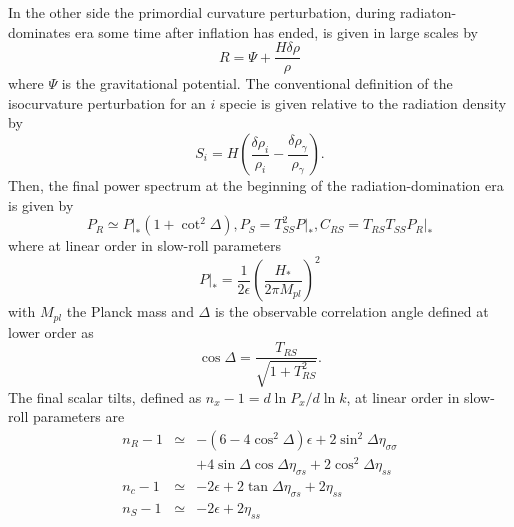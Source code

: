 \documentclass[twocolumn,           %
               showpacs,            %
               preprintnumbers,     %
               aps,                 %
               prl,          	    %
               letterpaper,             %
               superscriptaddress,      %
               nofootinbib,         %
               tightenlines,        %
               floats,floatfix      %
               ,usenatbib,
               ]{revtex4-1}
\begin{document}
In the other side the primordial curvature perturbation, during radiaton-dominates era some time after inflation has ended, is given in large scales by
\begin{equation}
R=\Psi+\frac{H\delta\rho}{\rho}
\end{equation}
where $\Psi$ is the gravitational potential. The conventional definition of the isocurvature perturbation for an $i$ specie is given relative to the radiation density by
\begin{equation}
S_i=H\left(\frac{\delta\rho_{i}}{\rho_{i}}-\frac{\delta\rho_\gamma}{\rho_\gamma}\right).
\end{equation}
Then, the final power spectrum at the beginning of the radiation-domination era is given by
\begin{subequations}\label{spectrums}
\begin{equation}\label{PRf}
P_R\simeq P|_*(1+\cot^2\Delta),
\end{equation}
\begin{equation}
P_S=T^2_{SS}P|_*,
\end{equation}
\begin{equation}
C_{RS}=T_{RS}T_{SS}P_R|_*
\end{equation}
\end{subequations}
where at linear order in slow-roll parameters
\begin{equation}
P|_*=\frac{1}{2\epsilon}\left(\frac{H_*}{2\pi M_{pl}}\right)^2
\end{equation}
with $M_{pl}$ the Planck mass and $\Delta$ is the observable correlation angle defined at lower order as
\begin{equation}
\cos\Delta =\frac{T_{RS}}{\sqrt{1+T_{RS}^2}}.
\end{equation}
The final scalar tilts, defined as $n_x-1=d\ln P_x/d\ln k$, at linear order in slow-roll parameters are
\begin{subequations}\label{tilts}
\begin{eqnarray}
n_R-1&\simeq & -(6-4\cos^2\Delta)\epsilon+2\sin^2\Delta\eta_{\sigma\sigma}\nonumber \\ &&+4\sin\Delta\cos\Delta\eta_{\sigma s}+2\cos^2\Delta\eta_{ss}\\
n_c-1&\simeq &-2\epsilon+2\tan\Delta\eta_{\sigma s}+2\eta_{ss}\\
n_S-1&\simeq & -2\epsilon+2\eta_{ss}
\end{eqnarray}
\end{subequations}
\end{document}
